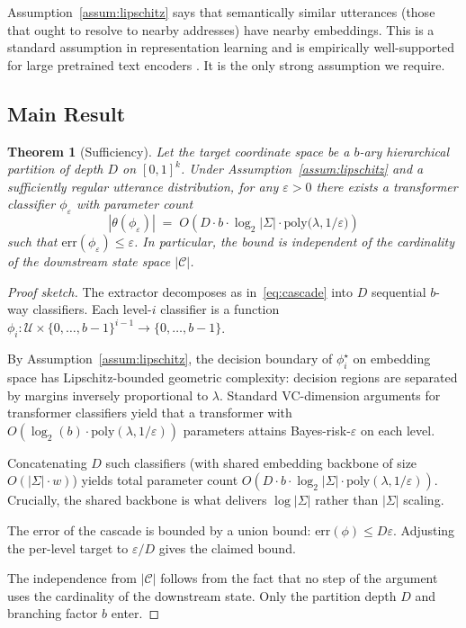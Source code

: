 \documentclass[11pt,twocolumn,a4paper]{article}
\newtheorem{theorem}{Theorem}[section]
\theoremstyle{definition}
\theoremstyle{remark}
\newcommand{\Cc}{\mathcal{C}}
\newcommand{\Uc}{\mathcal{U}}
\begin{document}
Assumption~\ref{assum:lipschitz} says that semantically similar utterances (those that ought to resolve to nearby addresses) have nearby embeddings. This is a standard assumption in representation learning and is empirically well-supported for large pretrained text encoders \citep{reimers2019sentencebert}. It is the only strong assumption we require.

\subsection{Main Result}

\begin{theorem}[Sufficiency]
\label{thm:sufficiency}
Let the target coordinate space be a $b$-ary hierarchical partition of depth $D$ on $[0,1]^k$. Under Assumption~\ref{assum:lipschitz} and a sufficiently regular utterance distribution, for any $\varepsilon > 0$ there exists a transformer classifier $\phi_\varepsilon$ with parameter count
\[
|\theta(\phi_\varepsilon)| \;=\; O\!\left( D \cdot b \cdot \log_2 |\Sigma| \cdot \mathrm{poly}\bigl(\lambda, 1/\varepsilon\bigr) \right)
\]
such that $\mathrm{err}(\phi_\varepsilon) \leq \varepsilon$. In particular, the bound is independent of the cardinality of the downstream state space $|\Cc|$.
\end{theorem}

\begin{proof}[Proof sketch]
The extractor decomposes as in~\eqref{eq:cascade} into $D$ sequential $b$-way classifiers. Each level-$i$ classifier is a function $\phi_i: \Uc \times \{0,\ldots,b-1\}^{i-1} \to \{0,\ldots,b-1\}$.

By Assumption~\ref{assum:lipschitz}, the decision boundary of $\phi_i^\star$ on embedding space has Lipschitz-bounded geometric complexity: decision regions are separated by margins inversely proportional to $\lambda$. Standard VC-dimension arguments for transformer classifiers \citep{bartlett2017vcbound, edelman2022transformers} yield that a transformer with $O(\log_2(b) \cdot \mathrm{poly}(\lambda, 1/\varepsilon))$ parameters attains Bayes-risk-$\varepsilon$ on each level.

Concatenating $D$ such classifiers (with shared embedding backbone of size $O(|\Sigma| \cdot w)$) yields total parameter count $O(D \cdot b \cdot \log_2 |\Sigma| \cdot \mathrm{poly}(\lambda, 1/\varepsilon))$. Crucially, the shared backbone is what delivers $\log |\Sigma|$ rather than $|\Sigma|$ scaling.

The error of the cascade is bounded by a union bound: $\mathrm{err}(\phi) \leq D \varepsilon$. Adjusting the per-level target to $\varepsilon/D$ gives the claimed bound.

The independence from $|\Cc|$ follows from the fact that no step of the argument uses the cardinality of the downstream state. Only the partition depth $D$ and branching factor $b$ enter.
\end{proof}
\end{document}

